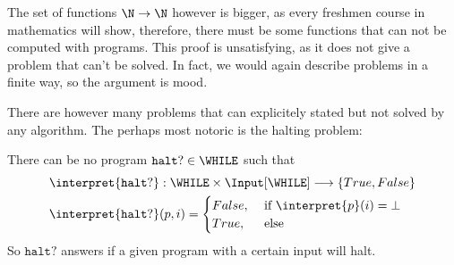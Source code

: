 The set of functions $\N \rightarrow \N$ however is bigger, as every freshmen 
course in mathematics will show, therefore, there must be some functions that
can not be computed with \WHILE programs. This proof is unsatisfying, as it
does not give a problem that can't be solved. In fact, we would again describe
problems in a finite way, so the argument is mood.

There are however many problems that can explicitely stated but not solved by 
any algorithm. The perhaps most notoric is the halting problem:

\begin{theorem}
	There can be no program $\mathtt{halt?}\in \WHILE$ such that 
	\begin{align*}
		\interpret{\mathtt{halt?}}&:\WHILE\times \Input[\WHILE] \longrightarrow \{True, False\}\\
		\interpret{\mathtt{halt?}}&(p, i) =\begin{cases}
			False, &\text{ if }\interpret{p}(i)=\bot\\
			True, &\text{ else}
		\end{cases}
	\end{align*}
	So $\mathtt{halt?}$ answers if a given program with a certain input will halt.
\end{theorem}
